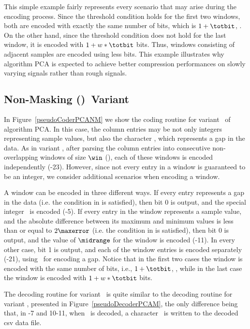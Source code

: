 \vspace{+5pt}


This simple example fairly represents every scenario that may arise during the encoding process. Since the threshold condition holds for the first two windows, both are encoded with exactly the same number of bits, which is $1 + \totbit$, \wheretotbit. On the other hand, since the threshold condition does not hold for the last window, it is encoded with $1 + w*\totbit$ bits. Thus, windows consisting of adjacent samples are encoded using less bits. This example illustrates why algorithm PCA is expected to achieve better compression performances on slowly varying signals rather than rough signals.




\subsection{Non-Masking (\NOmaskalgo)\ Variant}
\label{algo:pca:nmvariant}


In Figure~\ref{pseudoCoderPCANM} we show the coding routine for variant \NOmaskalgo\ of algorithm PCA. In this case, the column entries may be not only integers representing sample values, but also the character \noData, which represents a gap in the data. As in variant \maskalgo, after parsing the column entries into consecutive non-overlapping windows of size $\win$ (), each of these windows is encoded independently (-23). However, since not every entry in a window is guaranteed to be an integer, we consider additional scenarios when encoding a window.





A window can be encoded in three different ways. If every entry represents a gap in the data (i.e. the condition in  is satisfied), then bit 0 is output, and the special integer \nodata\ is encoded (-5). If every entry in the window represents a sample value, and the absolute difference between its maximum and minimum values is less than or equal to $2\maxerror$ (i.e. the condition in  is satisfied), then bit 0 is output, and the value of $\midrange$ for the window is encoded (-11). In every other case, bit 1 is output, and each of the window entries is encoded separately (-21), using \nodata\ for encoding a gap. Notice that in the first two cases the window is encoded with the same number of bits, i.e., $1 + \totbit$, \wheretotbit, while in the last case the window is encoded with $1 + w*\totbit$ bits.


The decoding routine for variant \NOmaskalgo\ is quite similar to the decoding routine for variant \maskalgo, presented in Figure~\ref{pseudoDecoderPCAM}, the only difference being that, in -7 and 10-11, when \nodata\ is decoded, a character \noData\ is written to the decoded csv data file.

